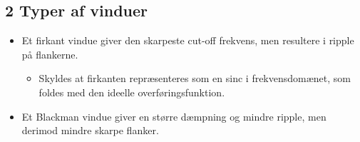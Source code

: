 \documentclass[danish]{article}
\begin{document}
\subsection*{2 Typer af vinduer}
\begin{itemize}
	\item Et firkant vindue giver den skarpeste cut-off frekvens, men resultere i ripple på flankerne.
	\begin{itemize}
		\item Skyldes at firkanten repræsenteres som en sinc i frekvensdomænet, som foldes med den ideelle overføringsfunktion.
	\end{itemize}
	\item Et Blackman vindue giver en større dæmpning og mindre ripple, men derimod mindre skarpe flanker.
\end{itemize}
\end{document}
